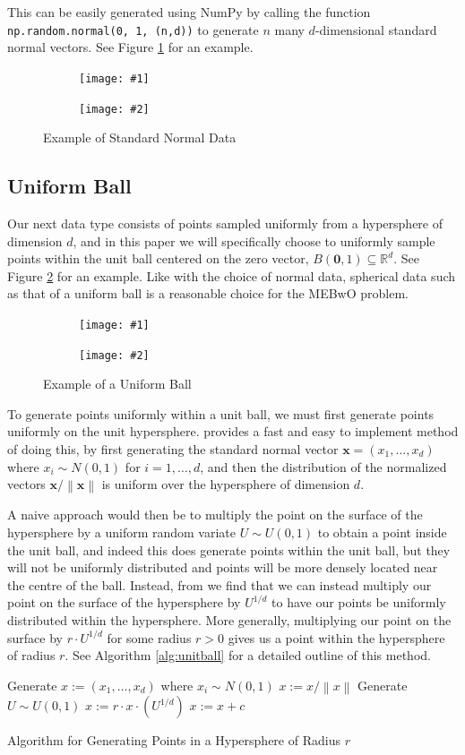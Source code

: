 \documentclass[11pt,twoside]{report}
\newcommand{\norm}[1]{\left\lVert#1\right\rVert} %
\newcommand{\pairfigure}[4]{
    \begin{figure}[ht]
        \centering
        \begin{subfigure}[b]{0.475\textwidth}
            \centering
            \texttt{[image: \#1]}
        \end{subfigure}
        \hfill
        \begin{subfigure}[b]{0.475\textwidth}
            \centering
            \texttt{[image: \#2]}
        \end{subfigure}
        \caption{#3}
        \label{#4}
\end{figure}
}
\newcommand{\datafigure}[3]{
    \pairfigure{data_plots/#1_2d.png}{data_plots/#1_3d.png}{#2}{#3}
}
\theoremstyle{definition}
\numberwithin{theorem}{section}
\numberwithin{definition}{section}
\numberwithin{lemma}{section}
\numberwithin{proposition}{section}
\numberwithin{equation}{section}
\numberwithin{figure}{section}
\begin{document}
This can be easily generated using NumPy \cite{numpy} by calling the function \texttt{np.random.normal(0, 1, (n,d))} to generate $n$ many $d$-dimensional standard normal vectors. See Figure \ref{fig:normal} for an example.

\datafigure{normal}{Example of Standard Normal Data}{fig:normal}

\subsection{Uniform Ball}\label{uniform ball}
Our next data type consists of points sampled uniformly from a hypersphere of dimension $d$, and in this paper we will specifically choose to uniformly sample points within the unit ball centered on the zero vector, $B(\mathbf{0},1)\subseteq\mathbb{R}^d$. See Figure \ref{fig:unifball} for an example. Like with the choice of normal data, spherical data such as that of a uniform ball is a reasonable choice for the MEBwO problem.

\datafigure{uniform_ball}{Example of a Uniform Ball}{fig:unifball}

To generate points uniformly within a unit ball, we must first generate points uniformly on the unit hypersphere. \cite{hyperspheresurface} provides a fast and easy to implement method of doing this, by first generating the standard normal vector $\mathbf{x}=(x_1,\ldots,x_d)$ where $x_i\sim N(0,1)$ for $i=1,\ldots,d$, and then the distribution of the normalized vectors $\mathbf{x}/\norm{\mathbf{x}}$ is uniform over the hypersphere of dimension $d$.

A naive approach would then be to multiply the point on the surface of the hypersphere by a uniform random variate $U\sim U(0,1)$ to obtain a point inside the unit ball, and indeed this does generate points within the unit ball, but they will not be uniformly distributed and points will be more densely located near the centre of the ball. Instead, from \cite{eldredge} we find that we can instead multiply our point on the surface of the hypersphere by $U^{1/d}$ to have our points be uniformly distributed within the hypersphere. More generally, multiplying our point on the surface by $r\cdot U^{1/d}$ for some radius $r>0$ gives us a point within the hypersphere of radius $r$. See Algorithm \ref{alg:unitball} for a detailed outline of this method.

\begin{algorithm}[H]
    Generate $x:=(x_1,\ldots,x_d)$ where $x_i\sim N(0,1)$\;
    $x:=x/\norm{x}$\;
    Generate $U\sim U(0,1)$\;
    $x:=r\cdot x\cdot \left(U^{1/d}\right)$\;
    $x:= x+c$\;
    
    \caption{Algorithm for Generating Points in a Hypersphere of Radius $r$}
    \label{alg:unitball}
\end{algorithm}
\end{document}
